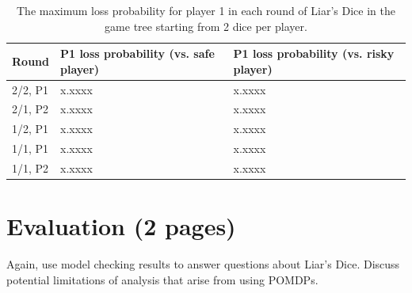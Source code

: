 \begin{table}[]
    \begin{tabular}{@{}lll@{}}
    \toprule
    Round                        & P1 loss probability (vs. safe player) & P1 loss probability (vs. risky player) \\ \midrule
    \multicolumn{1}{l|}{2/2, P1} & \multicolumn{1}{l|}{x.xxxx}          & x.xxxx                                \\
    \multicolumn{1}{l|}{2/1, P2} & \multicolumn{1}{l|}{x.xxxx}          & x.xxxx                                \\
    \multicolumn{1}{l|}{1/2, P1} & \multicolumn{1}{l|}{x.xxxx}          & x.xxxx                                \\
    \multicolumn{1}{l|}{1/1, P1} & \multicolumn{1}{l|}{x.xxxx}          & x.xxxx                                \\
    \multicolumn{1}{l|}{1/1, P2} & \multicolumn{1}{l|}{x.xxxx}          & x.xxxx                               
    \end{tabular}
    \caption{The maximum loss probability for player 1 in each round of Liar's Dice in the game tree starting from 2 dice per player.}
    \label{cs2:game_tree_table}
    \end{table}

\section{Evaluation (2 pages)}

Again, use model checking results to answer questions about Liar's Dice. Discuss potential limitations of analysis that arise from using POMDPs.

